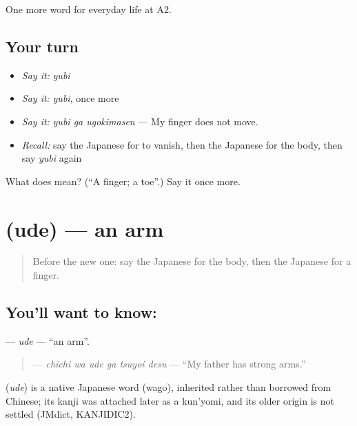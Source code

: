 \begin{grammarlens}[title={What you've built}]
One more word for everyday life at A2.
\end{grammarlens}

\subsection*{Your turn}
\begin{itemize}
\raggedright
  \item \emph{Say it:} \emph{yubi}
  \item \emph{Say it:} \emph{yubi}, once more
  \item \emph{Say it:} \emph{yubi ga ugokimasen} — My finger does not move.
  \item \emph{Recall:} say the Japanese for to vanish, then the Japanese for the body, then say \emph{yubi} again
\end{itemize}

\begin{tcolorbox}[breakable,colback=teal!4,colframe=teal!35!black,title={Before you move on}]
What does  mean? (\textquotedblleft{}A finger; a toe\textquotedblright{}.) Say it once more.
\end{tcolorbox}
\section[\texorpdfstring{\ja{うで} (ude)}{うで (ude)}]{ (ude) — an arm}

\label{lesson:JA-C215-ude}



\begin{quote}
Before the new one: say the Japanese for the body, then the Japanese for a finger.
\end{quote}

\subsection*{You'll want to know: }
\textbf{} — \emph{ude} — \textquotedblleft{}an arm\textquotedblright{}.

\begin{quote}
\textbf{  } — \emph{chichi wa ude ga tsuyoi desu} — \textquotedblleft{}My father has strong arms.\textquotedblright{}
\end{quote}

\begin{cousinweb}
\textbf{} (\emph{ude}) is a native Japanese word (wago), inherited rather than borrowed from Chinese; its kanji was attached later as a kun'yomi, and its older origin is not settled (JMdict, KANJIDIC2).
\end{cousinweb}

